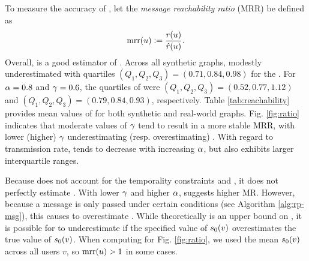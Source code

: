 To measure the accuracy of , let the \emph{message reachability ratio} (MRR) be defined as
\begin{equation}\label{eq:mrr}
  \operatorname{mrr}(u) := \frac{r(u)}{\hat{r}(u)}.
\end{equation}
Overall,  is a good estimator of . Across all synthetic graphs,  modestly underestimated  with quartiles $(Q_1, Q_2, Q_3) = (0.71, 0.84, 0.98)$ for the . For $\alpha = 0.8$ and $\gamma = 0.6$, the quartiles of  were $(Q_1, Q_2, Q_3) = (0.52, 0.77, 1.12)$ and $(Q_1, Q_2, Q_3) = (0.79, 0.84, 0.93)$, respectively. Table \ref{tab:reachability} provides mean values of  for both synthetic and real-world graphs. Fig. \ref{fig:ratio} indicates that moderate values of $\gamma$ tend to result in a more stable MRR, with lower (higher) $\gamma$ underestimating (resp. overestimating) . With regard to transmission rate,  tends to decrease with increasing $\alpha$, but also exhibits larger interquartile ranges.

Because  does not account for the temporality constraints  and , it does not perfectly estimate . With lower $\gamma$ and higher $\alpha$,  suggests higher MR. However, because a message is only passed under certain conditions (see Algorithm \ref{alg:rp-msg}), this causes  to overestimate . While  theoretically is an upper bound on , it is possible for  to underestimate  if the specified value of $s_0(v)$ overestimates the true value of $s_0(v)$. When computing  for Fig. \ref{fig:ratio}, we used the mean $s_0(v)$ across all users $v$, so $\operatorname{mrr}(u) > 1$ in some cases.

